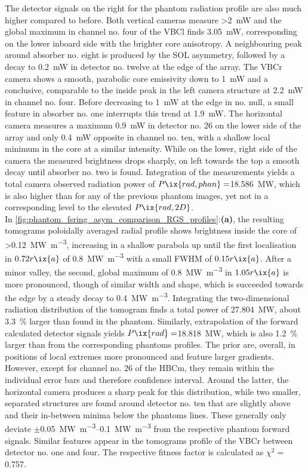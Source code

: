             The detector signals on the right for the phantom radiation profile are also much higher compared to before. Both vertical cameras measure >\SI{2}{\milli\watt} and the global maximum in channel no. four of the VBCl finds \SI{3.05}{\milli\watt}, corresponding on the lower inboard side with the brighter core anisotropy. A neighbouring peak around absorber no. eight is produced by the SOL asymmetry, followed by a decay to \SI{0.2}{\milli\watt} in detector no. twelve at the edge of the array. The VBCr camera shows a smooth, parabolic core emissivity down to \SI{1}{\milli\watt} and a conclusive, comparable to the inside peak in the left camera structure at \SI{2.2}{\milli\watt} in channel no. four. Before decreasing to \SI{1}{\milli\watt} at the edge in no. null, a small feature in absorber no. one interrupts this trend at \SI{1.9}{\milli\watt}. The horizontal camera measures a maximum \SI{0.9}{\milli\watt} in detector no. 26 on the lower side of the array and only \SI{0.4}{\milli\watt} opposite in channel no. ten, with a shallow local minimum in the core at a similar intensity. While on the lower, right side of the camera the measured brightness drops sharply, on left towards the top a smooth decay until absorber no. two is found. Integration of the measurements yields a total camera observed radiation power of $P\ix{rad,phan}=$\SI{18.586}{\mega\watt}, which is also higher than for any of the previous phantom images, yet not in a corresponding level to the elevated $P\ix{rad,2D}$.\\%
            In \cref{fig:phantom_fsring_asym_comparison_RGS_profiles}:\textbf{(a)}, the resulting tomograms poloidally averaged radial profile shows brightness inside the core of >\SI{0.12}{\mega\watt\per\cubic\meter}, increasing in a shallow parabola up until the first localisation in $0.72r\ix{a}$ of \SI{0.8}{\mega\watt\per\cubic\meter} with a small FWHM of $0.15r\ix{a}$. After a minor valley, the second, global maximum of \SI{0.8}{\mega\watt\per\cubic\meter} in $1.05r\ix{a}$ is more pronounced, though of similar width and shape, which is succeeded towards the edge by a steady decay to \SI{0.4}{\mega\watt\per\cubic\meter}. Integrating the two-dimensional radiation distribution of the tomogram finds a total power of \SI{27.804}{\mega\watt}, about \SI{3.3}{\percent} larger than found in the phantom. Similarly, extrapolation of the forward calculated detector signals yields $P\ix{rad}=$\SI{18.818}{\mega\watt}, which is also \SI{1.2}{\percent} larger than from the corresponding phantoms profiles. The prior are, overall, in positions of local extremes more pronounced and feature larger gradients. However, except for channel no. 26 of the HBCm, they remain within the individual error bars and therefore confidence interval. Around the latter, the horizontal camera produces a sharp peak for this distribution, while two smaller, separated structures are found around detector no. ten that are slightly above and their in-between minima below the phantoms lines. These generally only deviate $\pm$\SIrange{0.05}{0.1}{\mega\watt\per\cubic\meter} from the respective phantom forward signals. Similar features appear in the tomograms profile of the VBCr between detector no. one and four. The respective fitness factor is calculated as $\chi^{2}=$\SI{0.757}{\arbitraryunit}.\\%

